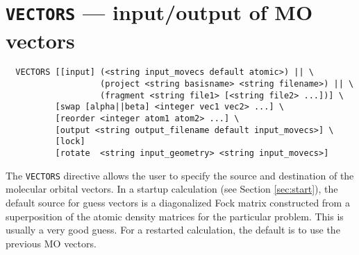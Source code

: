 \section{{\tt VECTORS} --- input/output of MO vectors}
\label{sec:vectors}


\begin{verbatim}
  VECTORS [[input] (<string input_movecs default atomic>) || \
                   (project <string basisname> <string filename>) || \
                   (fragment <string file1> [<string file2> ...])] \
          [swap [alpha||beta] <integer vec1 vec2> ...] \
          [reorder <integer atom1 atom2> ...] \
          [output <string output_filename default input_movecs>] \
          [lock]
          [rotate  <string input_geometry> <string input_movecs>] 
\end{verbatim}

The \verb+VECTORS+ directive allows the user to specify the source and
destination of the molecular orbital vectors.  In a startup
calculation (see Section \ref{sec:start}), the default source for
guess vectors is a diagonalized Fock matrix constructed from a
superposition of the atomic density matrices for the particular
problem.  This is usually a very good guess.  For a restarted 
calculation, the default is to use the previous MO vectors.


